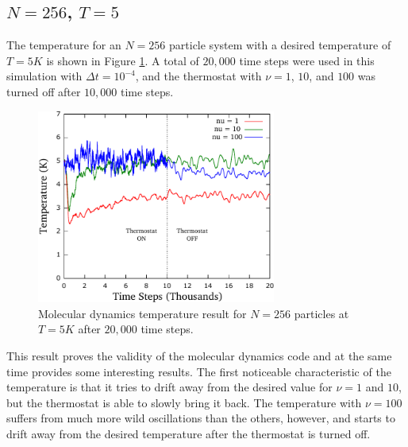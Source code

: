 \documentclass[12pt,oneside,a4paper]{article}
\newcommand{\dt}{\Delta t}
\begin{document}
\subsection{$N = 256$, $T = 5$}

The temperature for an $N=256$ particle system with a desired temperature of $T = 5 K$ is shown in Figure \ref{fig:temp}.  A total of $20,000$ time steps were used in this simulation with $\dt = 10^{-4}$, and the thermostat with $\nu=1$, $10$, and $100$ was turned off after $10,000$ time steps.
\begin{figure}[!h]
	\centering
	\includegraphics[width=0.7\textwidth]{../cpp/results/Temperature.pdf}
	\caption{Molecular dynamics temperature result for $N=256$ particles at $T = 5 K$ after $20,000$ time steps.}
	\label{fig:temp}
\end{figure} 
This result proves the validity of the molecular dynamics code and at the same time provides some interesting results.  The first noticeable characteristic of the temperature is that it tries to drift away from the desired value for $\nu=1$ and $10$, but the thermostat is able to slowly bring it back.  The temperature with $\nu=100$ suffers from much more wild oscillations than the others, however, and starts to drift away from the desired temperature after the thermostat is turned off.  
\end{document}
